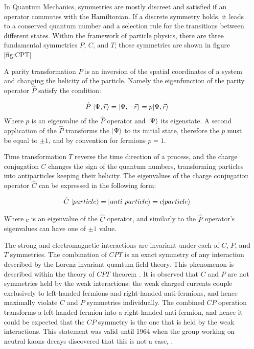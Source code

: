 In Quantum Mechanics, symmetries are mostly discreet and satisfied if an operator commutes with the Hamiltonian. If a discrete symmetry holds, it leads to a conserved quantum number and a selection rule for the transitions between different states. 
Within the framework of particle physics, there are three fundamental symmetries $P$, $C$, and $T$; those symmetries are shown in figure \ref{fig:CPT}

A parity transformation $P$ is an inversion of the spatial coordinates of a system and changing the helicity of the particle. Namely the eigenfunction of the parity operator $  \hat{P}$ satisfy the condition: 

\begin{equation}
    \hat{P}~ \lvert\Psi, \vec{r}\rangle = \lvert\Psi, - \vec{r}\rangle = p \lvert\Psi, \vec{r}\rangle  
\end{equation}
Where $p$ is an eigenvalue of the $ \hat{P}$ operator and $\lvert\Psi\rangle$ its eigenstate. A second application of the $\hat{P}$ transforms the $\lvert\Psi\rangle$ to its initial state, therefore the $p$ must be equal to $\pm 1$, and by convention for fermions $p=1$.  


Time transformation $T$ reverse the time direction of a process, and the charge conjugation $C$ changes the sign of the quantum numbers, transforming particles into antiparticles keeping their helicity. The eigenvalues of the  charge conjugation operator $\hat{C}$ can be expressed in the following form:
 

\begin{equation}
    \hat{C}~ \lvert particle\rangle = \lvert anti~ particle\rangle = c \lvert particle\rangle  
\end{equation}

Where $c$ is an eigenvalue of the $ \hat{C}$ operator, and similarly to the $\hat{P}$ operator's eigenvalues can have one of $\pm 1$ value.   

The strong and electromagnetic interactions are invariant under each of $C$, $P$, and $T$ symmetries.  The combination of $CPT$ is an exact symmetry of any interaction described by the Lorenz invariant quantum field theory. This phenomenon is described within the theory of  $CPT$ theorem \cite{CPT_theorm}.
It is observed that $C$ and $P$ are not symmetries held by the weak interactions: the weak charged currents couple exclusively to left-handed fermions and right-handed anti-fermions, and hence maximally violate $C$ and $P$ symmetries individually. The combined $CP$ operation transforms a left-handed fermion into a right-handed anti-fermion, and hence it could be expected that the $CP$ symmetry is the one that is held by the weak interactions. This statement was valid until 1964 when the group working on neutral kaons decays discovered that this is not a case, \cite{CPV_kaons}. 



